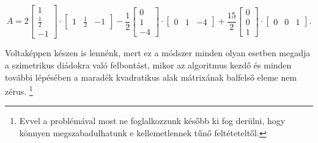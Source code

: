 \documentclass[9pt, a4paper, showtrims]{memoir}
\theoremstyle{plain}
\theoremstyle{remark}
\theoremstyle{definition}
\begin{document}
    \[
        A
        =
        2
        \begin{bmatrix}
        1\\ \frac{1}{2}\\ -1
        \end{bmatrix}
        \cdot
        \begin{bmatrix}
        1& \frac{1}{2}& -1
        \end{bmatrix}
        -\frac{1}{2}
        \begin{bmatrix}
            0\\1\\-4
        \end{bmatrix}
        \cdot
        \begin{bmatrix}
            0&1&-4
        \end{bmatrix}
        +
        \frac{15}{2}
        \begin{bmatrix}
            0\\0\\1
        \end{bmatrix}
        \cdot
        \begin{bmatrix}
            0&0&1
        \end{bmatrix}.
    \]

Voltaképpen készen is lennénk, mert
ez a módszer minden olyan esetben megadja a szimetrikus diádokra való felbontást,
mikor az algoritmus kezdő és minden további lépésében a maradék kvadratikus alak mátrixának balfelső eleme nem zérus.%
\footnote{
Evvel a problémával most ne foglalkozzunk később ki fog derülni, 
hogy könnyen megszabadulhatunk e kellemetlennek tűnő feltéteteltől.}
\end{document}
